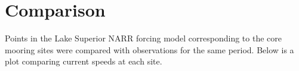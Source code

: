 \begin{comment}
The plot below shows coherence in current speeds between sites. 
\FIGURE{4}{core2011_current_coherence.pdf}{Core Mooring Coherence}{This shows the coherence in current speeds between mooring sites. The top 
row shows the magnitude squared coherence and the bottom shows the phase difference between sites at each frequency. The red line is at the Coriolis frequency and the three
blue lines are first three seiche frequencies.}

There is a statistically significant (greater than 0.5) coherence between the western mooring and central mooring at the inertial frequency, but not between any other two mooring sites. 
However, when if you look at coherence between zonal components and meridional components you get a different result. You get a statistically significant coherence between eastern
and central moorings. 

\FIGURE{4}{core2011_zonal_coherence.pdf}{Core Mooring Zonal Coherence}{This shows coherence in zonal component of current speed. The top 
row shows the magnitude squared coherence and the bottom shows the phase difference between sites at each frequency. The red line is at the Coriolis frequency and the three
blue lines are first three seiche frequencies.}

\FIGURE{4}{core2011_merid_coherence.pdf}{Core Mooring Meridional Coherence}{This shows coherence in meridional component of current speed. The top 
row shows the magnitude squared coherence and the bottom shows the phase difference between sites at each frequency. The red line is at the Coriolis frequency and the three
blue lines are first three seiche frequencies.}
\end{comment}


\section{Comparison}
Points in the Lake Superior NARR forcing model corresponding to the core mooring sites were compared with observations for the same period. Below is 
a plot comparing current speeds at each site.


